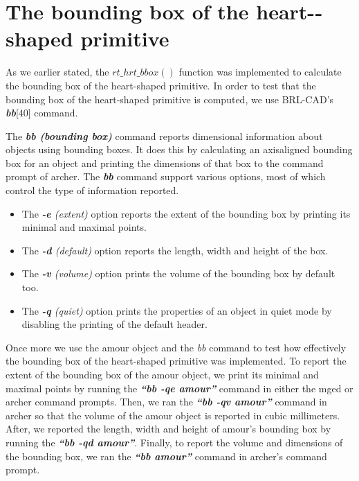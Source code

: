 
\section{The bounding box of the heart-­shaped primitive}

As   we   earlier   stated,   the   $rt\_hrt\_bbox()$   function   was   implemented   to
 calculate   the   bounding   box   of   the   heart-­shaped   primitive.   In   order   to   test   that  
the   bounding   box   of   the   heart-­shaped   primitive   is   computed,   we   use  
BRL­-CAD's \textit{\textbf{bb}}[40] command.

\hspace{30} The   \textit{\textbf{bb (bounding box)}}  command   reports   dimensional   information   about   objects   using  
bounding   boxes.   It   does   this   by   calculating   an   axis­aligned   bounding   box   for   an  
object   and   printing   the   dimensions   of   that   box   to   the   command   prompt   of  
archer.   The   \textit{\textbf{bb}}   command   support   various   options,   most   of   which   control   the  
type of information reported.  

\begin{itemize}
\item The \textit{\textbf{-­e} (extent)} option reports the extent of the bounding box by printing its minimal and maximal points.  
\item The \textit{\textbf{-­d} (default)} option reports the length, width and height of the box.  
\item The \textit{\textbf{-­v} (volume)} option prints the volume of the bounding box by default too.  
\item The \textit{\textbf{-­q} (quiet)} option prints the properties of an object in quiet mode by disabling the printing of the default header.
\end{itemize}

\hspace{30} Once   more   we   use   the   amour   object   and   the   \textit{bb}   command   to   test   how  
effectively   the   bounding   box   of   the   heart­-shaped   primitive   was   implemented.  
To   report   the   extent   of   the   bounding   box   of   the   amour   object,   we   print   its  
minimal   and   maximal   points   by   running   the   \textit{\textbf{“bb   ­-qe   amour”}}   command   in   either  
the   mged   or   archer   command   prompts.   Then,   we   ran   the   \textit{\textbf{“bb   -­qv   amour”}}  
command   in   archer   so   that   the   volume   of   the   amour   object   is   reported   in   cubic  
millimeters.   After,   we   reported   the   length,   width   and   height   of   amour's   bounding  
box   by   running   the   \textit{\textbf{“bb   ­-qd   amour”}}.   Finally,   to   report   the   volume   and  
dimensions   of   the   bounding   box,   we   ran   the   \textit{\textbf{“bb   amour”}}   command   in   archer's  
command prompt. 

